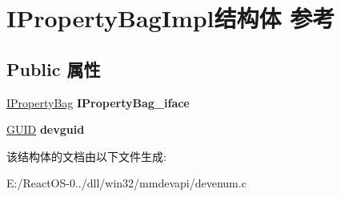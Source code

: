 \hypertarget{struct_i_property_bag_impl}{}\section{I\+Property\+Bag\+Impl结构体 参考}
\label{struct_i_property_bag_impl}
\subsection*{Public 属性}
\begin{DoxyCompactItemize}
\item 
\mbox{\label{struct_i_property_bag_impl_a6a6b839f44065f0f881c7bf41881e831}} 
\hyperlink{interface_i_property_bag}{I\+Property\+Bag} {\bfseries I\+Property\+Bag\+\_\+iface}
\item 
\mbox{\label{struct_i_property_bag_impl_a01eaf90da515fe2274bd8949f4be3e28}} 
\hyperlink{interface_g_u_i_d}{G\+U\+ID} {\bfseries devguid}
\end{DoxyCompactItemize}


该结构体的文档由以下文件生成\+:\begin{DoxyCompactItemize}
\item 
E\+:/\+React\+O\+S-\/0../dll/win32/mmdevapi/devenum.\+c\end{DoxyCompactItemize}

